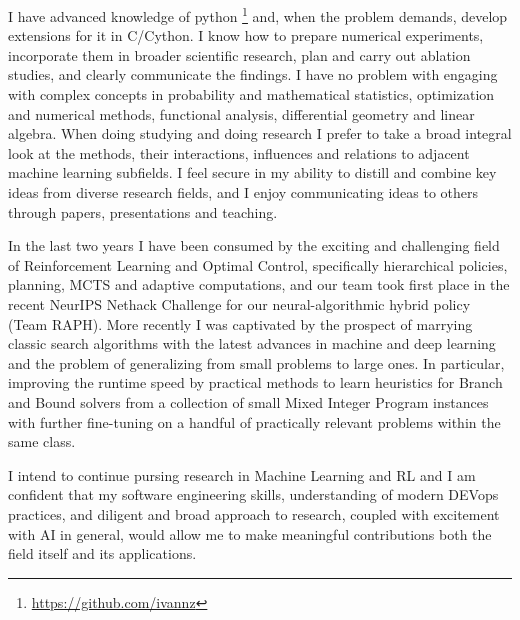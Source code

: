 \documentclass[14pt]{letter}
\begin{document}
I have advanced knowledge of python%
\footnote{
    \url{https://github.com/ivannz}
}
and, when the problem demands, develop extensions for it in C/Cython. I know how to prepare
numerical experiments, incorporate them in broader scientific research, plan and carry
out ablation studies, and clearly communicate the findings. I have no problem with engaging
with complex concepts in probability and mathematical statistics, optimization and numerical
methods, functional analysis, differential geometry and linear algebra. When doing studying
and doing research I prefer to take a broad integral look at the methods, their interactions,
influences and relations to adjacent machine learning subfields. I feel secure in my ability
to distill and combine key ideas from diverse research fields, and I enjoy communicating
ideas to others through papers, presentations and teaching.
\par\medskip

In the last two years I have been consumed by the exciting and challenging field of Reinforcement
Learning and Optimal Control, specifically hierarchical policies, planning, MCTS and adaptive
computations, and our team took first place in the recent NeurIPS Nethack Challenge for
our neural-algorithmic hybrid policy (Team RAPH). More recently I was captivated by the
prospect of marrying classic search algorithms with the latest advances in machine and deep
learning and the problem of generalizing from small problems to large ones. In particular,
improving the runtime speed by practical methods to learn heuristics for Branch and Bound
solvers from a collection of small Mixed Integer Program instances with further fine-tuning
on a handful of practically relevant problems within the same class.

I intend to continue pursing research in Machine Learning and RL and I am confident that my
software engineering skills, understanding of modern DEVops practices, and diligent and broad
approach to research, coupled with excitement with AI in general, would allow me to make
meaningful contributions both the field itself and its applications.
\par\medskip

\end{document}
